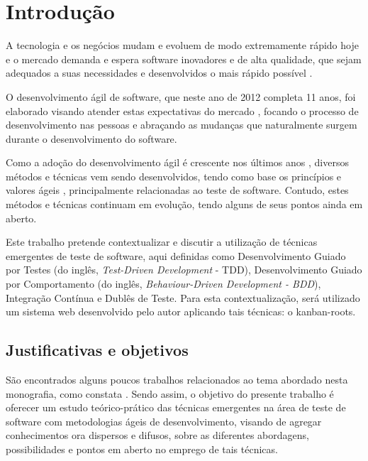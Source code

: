 \chapter{Introdução}

A tecnologia e os negócios mudam e evoluem de modo extremamente rápido hoje e o mercado demanda e espera software inovadores e de alta qualidade, que sejam adequados a suas necessidades e desenvolvidos o mais rápido possível \cite{TheBusinessOfInnovation}.

O desenvolvimento ágil de software, que neste ano de 2012 completa 11 anos, foi elaborado visando atender estas expectativas do mercado \cite{AgileManifesto}, focando o processo de desenvolvimento nas pessoas e abraçando as mudanças que naturalmente surgem durante o desenvolvimento do software.

Como a adoção do desenvolvimento ágil é crescente nos últimos anos \cite{ResumoChaosReport}, diversos métodos e técnicas vem sendo desenvolvidos, tendo como base os princípios e valores ágeis \cite{BDDRodrigo}, principalmente relacionadas ao teste de software. Contudo, estes métodos e técnicas continuam em evolução, tendo alguns de seus pontos ainda em aberto.

Este trabalho pretende contextualizar e discutir a utilização de técnicas emergentes de teste de software, aqui definidas como Desenvolvimento Guiado por Testes (do inglês, \textit{Test-Driven Development} - TDD), Desenvolvimento Guiado por Comportamento (do inglês, \textit{Behaviour-Driven Development - BDD}), Integração Contínua e Dublês de Teste. Para esta contextualização, será utilizado um sistema web desenvolvido pelo autor aplicando tais técnicas: o kanban-roots.

\section{Justificativas e objetivos}

São encontrados alguns poucos trabalhos relacionados ao tema abordado nesta monografia, como constata . Sendo assim, o objetivo do presente trabalho é oferecer um estudo teórico-prático das técnicas emergentes na área de teste de software com metodologias ágeis de desenvolvimento, visando de agregar conhecimentos ora dispersos e difusos, sobre as diferentes abordagens, possibilidades e pontos em aberto no emprego de tais técnicas.

